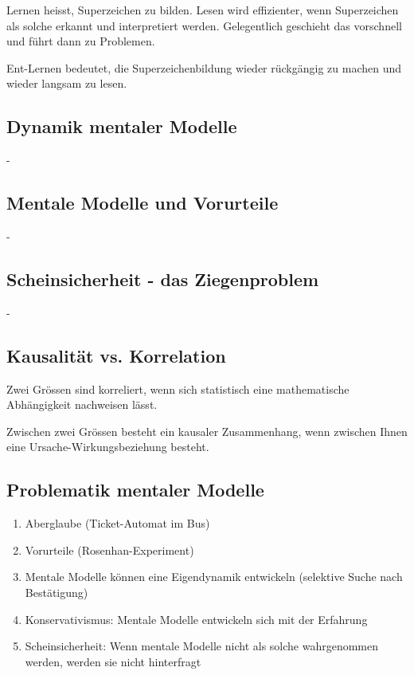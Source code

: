 \documentclass[
	final,
	a4paper,
	oneside,
	parskip=full,
	headings=standardclasses,
	headings=big,
	pointednumbers
]{scrartcl}
\begin{document}
        Lernen heisst, Superzeichen zu bilden. Lesen wird effizienter, wenn Superzeichen
        als solche erkannt und interpretiert werden. Gelegentlich geschieht das vorschnell
        und führt dann zu Problemen.

        Ent-Lernen bedeutet, die Superzeichenbildung wieder rückgängig zu machen und
        wieder langsam zu lesen.

	\subsection*{Dynamik mentaler Modelle}

        -

	\subsection*{Mentale Modelle und Vorurteile}

        -

	\subsection*{Scheinsicherheit - das Ziegenproblem}

        -

	\subsection*{Kausalität vs. Korrelation}

            Zwei Grössen sind korreliert, wenn sich statistisch eine mathematische
            Abhängigkeit nachweisen lässt.

            Zwischen zwei Grössen besteht ein kausaler Zusammenhang, wenn
            zwischen Ihnen eine Ursache-Wirkungsbeziehung besteht.

	\subsection*{Problematik mentaler Modelle}


        \begin{enumerate}[label=\arabic*.]
            \setlength{\parskip}{1mm}
            \item Aberglaube (Ticket-Automat im Bus)
            \item Vorurteile (Rosenhan-Experiment)
            \item Mentale Modelle können eine
                  Eigendynamik entwickeln (selektive
                  Suche nach Bestätigung)
            \item Konservativismus: Mentale Modelle entwickeln sich mit der
                  Erfahrung
            \item Scheinsicherheit: Wenn mentale Modelle nicht als solche
                  wahrgenommen werden, werden sie nicht hinterfragt
        \end{enumerate}
\end{document}
